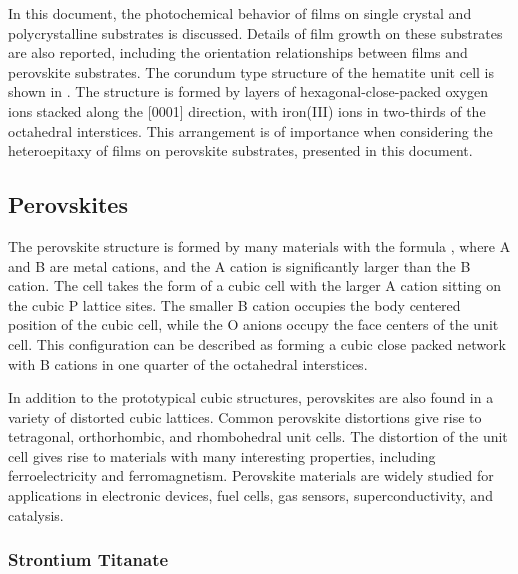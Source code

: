 In this document, the photochemical behavior of  films on single crystal and polycrystalline substrates is discussed. Details of  film growth on these substrates are also reported, including the orientation relationships between  films and perovskite substrates. The corundum type structure of the hematite unit cell is shown in . The structure is formed by layers of hexagonal-close-packed oxygen ions stacked along the [0001] direction, with iron(III) ions in two-thirds of the octahedral interstices. This arrangement is of importance when considering the heteroepitaxy of  films on perovskite substrates, presented in this document. 

\subsection{Perovskites}\label{subsec:background.perovskites}

The perovskite structure is formed by many materials with the formula , where A and B are metal cations, and the A cation is significantly larger than the B cation.\cite{Bhalla:2000ku} The cell takes the form of a cubic cell with the larger A cation sitting on the cubic P lattice sites. The smaller B cation occupies the body centered position of the cubic cell, while the O anions occupy the face centers of the unit cell. This configuration can be described as  forming a cubic close packed network with B cations in one quarter of the octahedral interstices.

In addition to the prototypical cubic structures, perovskites are also found in a variety of distorted cubic lattices. Common perovskite distortions give rise to tetragonal, orthorhombic, and rhombohedral unit cells. The distortion of the unit cell gives rise to materials with many interesting properties, including ferroelectricity and ferromagnetism. Perovskite materials are widely studied\cite{Bhalla:2000ku} for applications in electronic devices,\cite{Kingon:2000wa} fuel cells,\cite{Zhu:2003jz,Jiang:2008fb} gas sensors,\cite{Fergus:2007tm} superconductivity,\cite{Murphy:1987wc} and catalysis.\cite{Lombardo:1998uv}

\subsubsection{Strontium Titanate}\label{subsubsec:background.sto}

